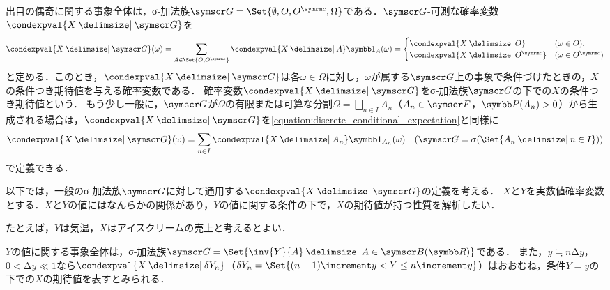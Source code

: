 \documentclass[../../main]{subfiles}
\begin{document}
出目の偶奇に関する事象全体は，σ‐加法族\(\sigmaalg{G}=\Set{\emptyset,O,\scomp{O},\Omega}\)である．\(\sigmaalg{G}\)‐可測な確率変数\(\condexpval{X\given\sigmaalg{G}}\)を
\begin{equation}
  \label{equation:discrete_conditional_expectation}
  \condexpval{X\given\sigmaalg{G}}(\omega) = \sum_{A\in\Set{O,\scomp{O}}}\condexpval{X\given A}\indicator_A(\omega)
  = \begin{cases}\condexpval{X\given O} & (\omega\in O),\\ \condexpval{X\given\scomp{O}} & (\omega\in\scomp{O})\end{cases}
\end{equation}
と定める．このとき，\(\condexpval{X\given\sigmaalg{G}}\)は各\(\omega\in\Omega\)に対し，\(\omega\)が属する\(\sigmaalg{G}\)上の事象で条件づけたときの，\(X\)の条件つき期待値を与える確率変数である．
確率変数\(\condexpval{X\given\sigmaalg{G}}\)をσ‐加法族\(\sigmaalg{G}\)の下での\(X\)の条件つき期待値という．
もう少し一般に，\(\sigmaalg{G}\)が\(\Omega\)の有限または可算な分割\(\Omega=\bigsqcup_{n\in I}A_n\)（\(A_n\in\sigmaalg{F}\)，\(\prob(A_n)>0\)）から生成される場合は，\(\condexpval{X\given\sigmaalg{G}}\)を\cref{equation:discrete_conditional_expectation}と同様に
\[
  \condexpval{X\given\sigmaalg{G}}(\omega) = \sum_{n\in I}\condexpval{X\given A_n}\indicator_{A_n}(\omega)\quad(\sigmaalg{G}=\sigmagen{\Set{A_n\given n\in I}})
\]
で定義できる．

以下では，一般のσ‐加法族\(\sigmaalg{G}\)に対して通用する\(\condexpval{X\given\sigmaalg{G}}\)の定義を考える．
\(X\)と\(Y\)を実数値確率変数とする．\(X\)と\(Y\)の値にはなんらかの関係があり，\(Y\)の値に関する条件の下で，\(X\)の期待値が持つ性質を解析したい．

\begin{note}
  たとえば，\(Y\)は気温，\(X\)はアイスクリームの売上と考えるとよい．  
\end{note}

\(Y\)の値に関する事象全体は，σ‐加法族\(\sigmaalg{G}=\Set{\inv{Y}{A}\given A\in\borelset{\numset{R}}}\)である．
また，\(y\fallingdotseq n\increment y\)，\(0<\increment y\ll 1\)なら\(\condexpval{X\given\delta Y_n}\)（\(\delta Y_n=\Set{(n-1)\increment y<Y\leq n\increment y}\)）はおおむね，条件\(Y=y\)の下での\(X\)の期待値を表すとみられる．
\end{document}
